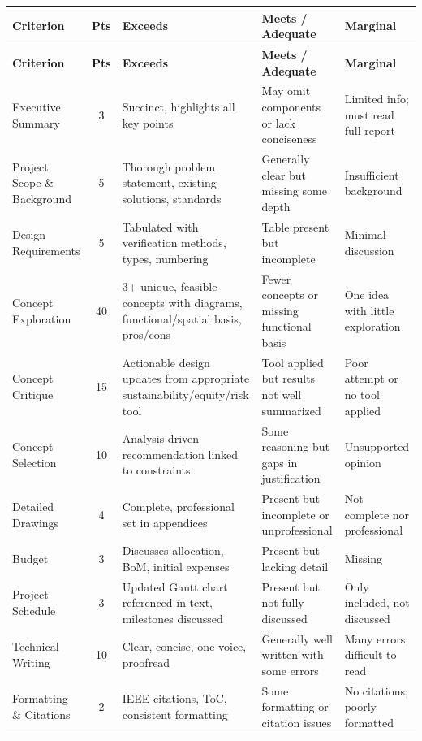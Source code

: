 {\small
\begin{longtable}{p{3.2cm} c p{3.5cm} p{3.5cm} p{2.8cm}}
\toprule
\textbf{Criterion} & \textbf{Pts} & \textbf{Exceeds} & \textbf{Meets / Adequate} & \textbf{Marginal} \\
\midrule
\endfirsthead
\toprule
\textbf{Criterion} & \textbf{Pts} & \textbf{Exceeds} & \textbf{Meets / Adequate} & \textbf{Marginal} \\
\midrule
\endhead
\bottomrule
\endfoot

Executive Summary & 3 & Succinct, highlights all key points & May omit components or lack conciseness & Limited info; must read full report \\
\addlinespace
Project Scope \& Background & 5 & Thorough problem statement, existing solutions, standards & Generally clear but missing some depth & Insufficient background \\
\addlinespace
Design Requirements & 5 & Tabulated with verification methods, types, numbering & Table present but incomplete & Minimal discussion \\
\addlinespace
Concept Exploration & 40 & 3+ unique, feasible concepts with diagrams, functional/spatial basis, pros/cons & Fewer concepts or missing functional basis & One idea with little exploration \\
\addlinespace
Concept Critique & 15 & Actionable design updates from appropriate sustainability/equity/risk tool & Tool applied but results not well summarized & Poor attempt or no tool applied \\
\addlinespace
Concept Selection & 10 & Analysis-driven recommendation linked to constraints & Some reasoning but gaps in justification & Unsupported opinion \\
\addlinespace
Detailed Drawings & 4 & Complete, professional set in appendices & Present but incomplete or unprofessional & Not complete nor professional \\
\addlinespace
Budget & 3 & Discusses allocation, BoM, initial expenses & Present but lacking detail & Missing \\
\addlinespace
Project Schedule & 3 & Updated Gantt chart referenced in text, milestones discussed & Present but not fully discussed & Only included, not discussed \\
\addlinespace
Technical Writing & 10 & Clear, concise, one voice, proofread & Generally well written with some errors & Many errors; difficult to read \\
\addlinespace
Formatting \& Citations & 2 & IEEE citations, ToC, consistent formatting & Some formatting or citation issues & No citations; poorly formatted \\

\end{longtable}
}

